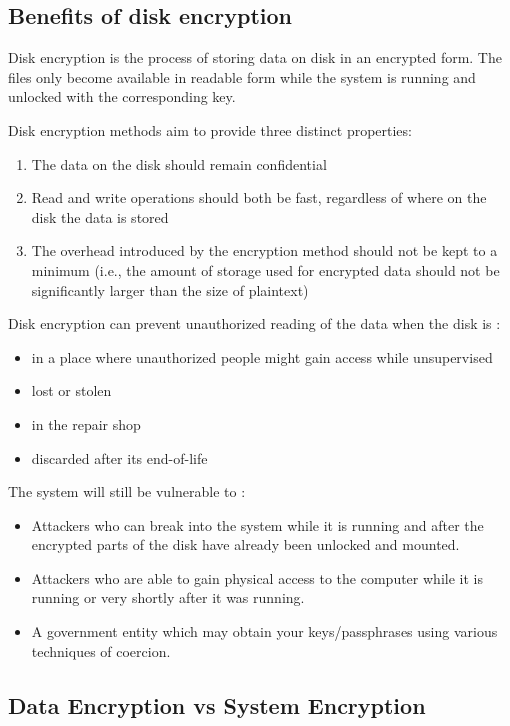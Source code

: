 \subsection{Benefits of disk encryption}
\label{sub-sec:benefits-enc}

Disk encryption is the process of storing data on disk in an encrypted form. The files only become available in readable form while the system is running and unlocked with the corresponding key.

Disk encryption methods aim to provide three distinct properties:
\begin{enumerate}
\item The data on the disk should remain confidential
\item Read and write operations should both be fast, regardless of where on the disk the data is stored
\item The overhead introduced by the encryption method should not be kept to a minimum (i.e., the amount of storage used for encrypted data should not be significantly larger than the size of plaintext)
\end{enumerate}

Disk encryption can prevent unauthorized reading of the data when the disk is
\cite{disk-enc}:
\begin{itemize}
\item in a place where unauthorized people might gain access while unsupervised
\item lost or stolen
\item in the repair shop
\item discarded after its end-of-life
\end{itemize}

The system will still be vulnerable to
\cite{disk-enc}:
\begin{itemize}
\item Attackers who can break into the system while it is running and after the encrypted parts of the disk have already been unlocked and mounted.
\item Attackers who are able to gain physical access to the computer while it is running or very shortly after it was running.
\item A government entity which may obtain your keys/passphrases using various techniques of coercion.
\end{itemize}

\subsection{Data Encryption vs System Encryption}
\label{sub-sec:de-vs-se}

